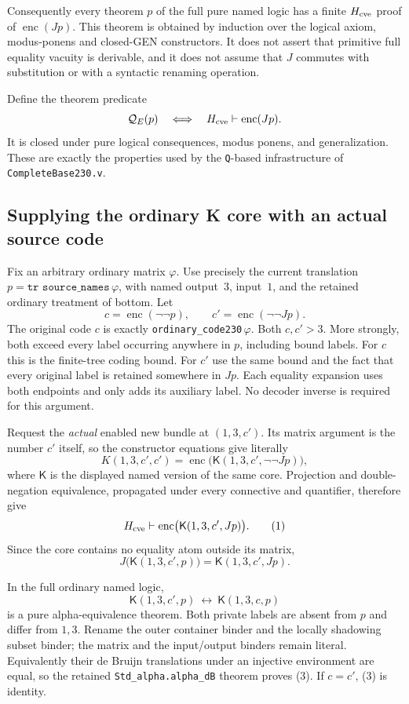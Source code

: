 Consequently every theorem $p$ of the full pure named logic has a finite
$H_{\rm cve}$ proof of $\operatorname{enc}(Jp)$.  This theorem is obtained
by induction over the logical axiom, modus-ponens and closed-GEN
constructors.  It does not assert that primitive full equality vacuity
is derivable, and it does not assume that $J$ commutes with substitution
or with a syntactic renaming operation.

Define the theorem predicate
\[
 \mathcal Q_E(p)\quad\Longleftrightarrow\quad
 H_{\rm cve}\vdash\operatorname{enc}(Jp).
\]
It is closed under pure logical consequences, modus ponens, and
generalization.  These are exactly the properties used by the
\texttt{Q}-based infrastructure of \texttt{CompleteBase230.v}.

\subsection{Supplying the ordinary K core with an actual source code}

Fix an arbitrary ordinary matrix $\varphi$.  Use precisely the current
translation $p=\texttt{tr source\_names}\,\varphi$, with named output~$3$,
input~$1$, and the retained ordinary treatment of bottom.  Let
\[
 c=\operatorname{enc}(\neg\neg p),\qquad
 c'=\operatorname{enc}(\neg\neg Jp).
\]
The original code $c$ is exactly
\texttt{ordinary\_code230}\,$\varphi$.  Both $c,c'>3$.  More strongly,
both exceed every label occurring anywhere in $p$, including bound labels.
For $c$ this is the finite-tree coding bound.  For $c'$ use the same
bound and the fact that every original label is retained somewhere in
$Jp$.  Each equality expansion uses both endpoints and only adds its
auxiliary label.  No decoder inverse is required for this argument.

Request the \emph{actual} enabled new bundle at $(1,3,c')$.  Its matrix
argument is the number $c'$ itself, so the constructor equations give
literally
\[
 K(1,3,c',c')
  =\operatorname{enc}\bigl(\mathsf K(1,3,c',\neg\neg Jp)\bigr),
\]
where $\mathsf K$ is the displayed named version of the same core.
Projection and double-negation equivalence, propagated under every
connective and quantifier, therefore give
\[
 H_{\rm cve}\vdash
 \operatorname{enc}\bigl(\mathsf K(1,3,c',Jp)\bigr).
 \tag{1}
\]
Since the core contains no equality atom outside its matrix,
\[
 J\bigl(\mathsf K(1,3,c',p)\bigr)
   =\mathsf K(1,3,c',Jp).
 \tag{2}
\]

In the full ordinary named logic,
\[
 \mathsf K(1,3,c',p)\ \longleftrightarrow\
 \mathsf K(1,3,c,p)
 \tag{3}
\]
is a pure alpha-equivalence theorem.  Both private labels are absent
from $p$ and differ from $1,3$.  Rename the outer container binder and
the locally shadowing subset binder; the matrix and the input/output
binders remain literal.  Equivalently their de Bruijn translations
under an injective environment are equal, so the retained
\texttt{Std\_alpha.alpha\_dB} theorem proves (3).
If $c=c'$, (3) is identity.

